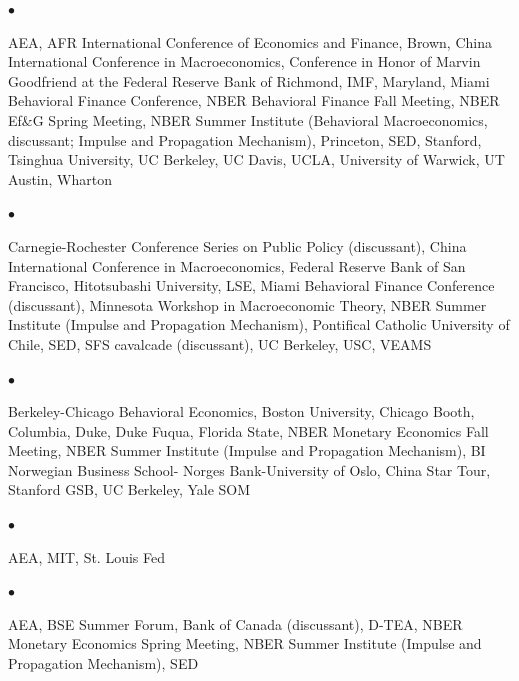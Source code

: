 \documentclass[line]{res}
\newenvironment{list1}{
  \begin{list}{\ding{113}}{%
      \setlength{\itemsep}{0.07in}
      \setlength{\parsep}{0in} \setlength{\parskip}{0in}
		\setlength{\topsep}{0.07in} \setlength{\partopsep}{0in} 
      \setlength{\leftmargin}{0.0in}}}{\end{list}}
\newenvironment{list2}{
  \begin{list}{$\bullet$}{%
      \setlength{\itemsep}{0in}
      \setlength{\parsep}{0in} \setlength{\parskip}{0in}
      \setlength{\topsep}{0in} \setlength{\partopsep}{0in} 
      \setlength{\leftmargin}{0in}}}{\end{list}}
\begin{document}
\begin{resume}
\begin{list1}
\item[2022]
\begin{list2}
\item[] AEA, AFR International Conference of Economics and Finance, Brown, China International Conference in Macroeconomics, Conference in Honor of Marvin Goodfriend at the Federal Reserve Bank of Richmond, IMF, Maryland, Miami Behavioral Finance Conference, NBER Behavioral Finance Fall Meeting, NBER Ef\&G Spring Meeting, NBER Summer Institute (Behavioral Macroeconomics, discussant; Impulse and Propagation Mechanism), Princeton, SED, Stanford, Tsinghua University, UC Berkeley, UC Davis, UCLA, University of Warwick, UT Austin, Wharton
\end{list2}

\item[2021]
\begin{list2}
\item[] Carnegie-Rochester Conference Series on Public Policy (discussant), China International Conference in Macroeconomics, Federal Reserve Bank of San Francisco, Hitotsubashi University, LSE, Miami Behavioral Finance Conference (discussant), Minnesota Workshop in Macroeconomic Theory, NBER Summer Institute (Impulse and Propagation Mechanism), Pontifical Catholic University of Chile, SED, SFS cavalcade (discussant), UC Berkeley, USC, VEAMS
\end{list2}

\item[2020]
\begin{list2}
\item[] Berkeley-Chicago Behavioral Economics, Boston University, Chicago Booth, Columbia, Duke, Duke Fuqua, Florida State, NBER Monetary Economics Fall Meeting, NBER Summer Institute (Impulse and Propagation Mechanism), BI Norwegian Business School- Norges Bank-University of Oslo, China Star Tour, Stanford GSB, UC Berkeley, Yale SOM
\end{list2}

\item[2019] 
\begin{list2}
\item[] AEA, MIT, St. Louis Fed
\end{list2}

\item[2018] 
\begin{list2}
\item[] AEA, BSE Summer Forum, Bank of Canada (discussant), D-TEA, NBER Monetary Economics Spring Meeting, NBER Summer Institute (Impulse and Propagation Mechanism), SED
\end{list2}


\end{list1}
\end{resume}
\end{document}
